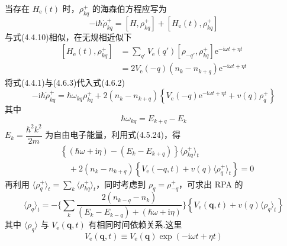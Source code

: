 当存在 $H_{\mathrm{e}}(t)$ 时，$\rho_{kq}^{+}$ 的海森伯方程应写为
\begin{equation}
  -\mathrm{i}\hbar\dot{\rho}_{kq}^{+}=\left[H,\rho_{kq}^{+}\right]
  +\left[H_{\mathrm{e}}(t),\rho_{kq}^{+}\right]
\end{equation}
与式(4.4.10)相似，在无规相近似下
\begin{equation}
\begin{aligned}
  \left[H_{\mathrm{e}}(t),\rho_{kq}^{+}\right]
  &=\sum_{q'}V_{\mathrm{e}}(q')\left[\rho_{-q'},\rho_{kq}^{+}\right]
  \mathrm{e}^{-\mathrm{i}\omega t+\eta t}\\
  &=2V_{\mathrm{e}}(-q)\left(n_{k}-n_{k+q}\right)\mathrm{e}^{-\mathrm{i}\omega t+\eta t}
\end{aligned}
\end{equation}
将式(4.4.1)与(4.6.3)代入式(4.6.2)
\begin{equation}
  -\mathrm{i}\hbar\dot{\rho}_{kq}^{+}=\hbar\omega_{kq}\rho_{kq}^{+}
  +2\left(n_{k}-n_{k+q}\right)\left\{V_{\mathrm{e}}(-q)\mathrm{e}^{-\mathrm{i}\omega t+\eta t}
  +v(q)\rho_{q}^{+}\right\}
\end{equation}
其中
\begin{equation}
  \hbar\omega_{kq}=E_{k+q}-E_{k}
\end{equation}
$E_{k}=\dfrac{\hbar^{2}k^{2}}{2m}$ 为自由电子能量，利用式(4.5.24)，得
\begin{equation}
\begin{aligned}
  &\left\{\left(\hbar\omega+\mathrm{i}\eta\right)-\left(E_{k}-E_{k+q}\right)\right\}
  \langle\rho_{kq}^{+}\rangle_{t}\\
  &\quad+2\left(n_{k}-n_{k+q}\right)\left\{V_{\mathrm{e}}(-q,t)
  +v(q)\langle\rho_{q}^{+}\rangle_{t}\right\}=0
\end{aligned}
\end{equation}
再利用 $\langle\rho_{q}^{+}\rangle_{t}=\displaystyle\sum_{k}\langle\rho_{kq}^{+}\rangle_{t}$，同时考虑到 $\rho_{q}=\rho_{-q}^{+}$，可求出 RPA 的
\begin{equation}
  \langle\rho_{q}\rangle_{t}=-\bigg\{\sum_{k}
  \frac{2\left(n_{k-q}-n_{k}\right)}
  {\left(E_{k}-E_{k-q}\right)+\left(\hbar\omega+\mathrm{i}\eta\right)}\bigg\}
  \left\{V_{\mathrm{e}}(\boldsymbol{q},t)+v(q)\langle\rho_{q}\rangle_{t}\right\}
\end{equation}
其中 $\langle\rho_{q}\rangle$ 与 $V_{\mathrm{e}}(\boldsymbol{q},t)$ 有相同时间依赖关系.这里
\begin{equation}
  V_{\mathrm{e}}(\boldsymbol{q},t)\equiv V_{\mathrm{e}}(\boldsymbol{q})
  \exp\left(-\mathrm{i}\omega t+\eta t\right)
\end{equation}
